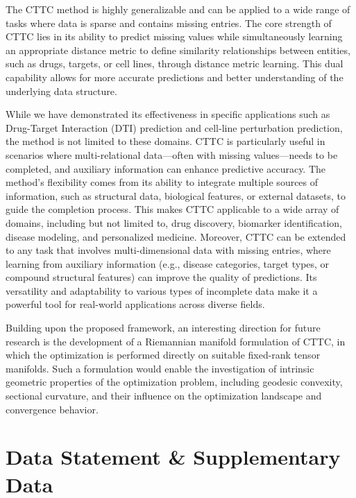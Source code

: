 \documentclass{article}
\begin{document}
The CTTC method is highly generalizable and can be applied to a wide range of tasks where data is sparse and contains missing entries. The core strength of CTTC lies in its ability to predict missing values while simultaneously learning an appropriate distance metric to define similarity relationships between entities, such as drugs, targets, or cell lines, through distance metric learning. This dual capability allows for more accurate predictions and better understanding of the underlying data structure.

While we have demonstrated its effectiveness in specific applications such as Drug-Target Interaction (DTI) prediction and cell-line perturbation prediction, the method is not limited to these domains. CTTC is particularly useful in scenarios where multi-relational data—often with missing values—needs to be completed, and auxiliary information can enhance predictive accuracy. The method's flexibility comes from its ability to integrate multiple sources of information, such as structural data, biological features, or external datasets, to guide the completion process. This makes CTTC applicable to a wide array of domains, including but not limited to, drug discovery, biomarker identification, disease modeling, and personalized medicine. Moreover, CTTC can be extended to any task that involves multi-dimensional data with missing entries, where learning from auxiliary information (e.g., disease categories, target types, or compound structural features) can improve the quality of predictions. Its versatility and adaptability to various types of incomplete data make it a powerful tool for real-world applications across diverse fields.

Building upon the proposed framework, an interesting direction for future research is the development of a Riemannian manifold formulation of CTTC, in which the optimization is performed directly on suitable fixed-rank tensor manifolds. Such a formulation would enable the investigation of intrinsic geometric properties of the optimization problem, including geodesic convexity, sectional curvature, and their influence on the optimization landscape and convergence behavior.


\section*{Data Statement \& Supplementary Data}\label{supp}
\end{document}

